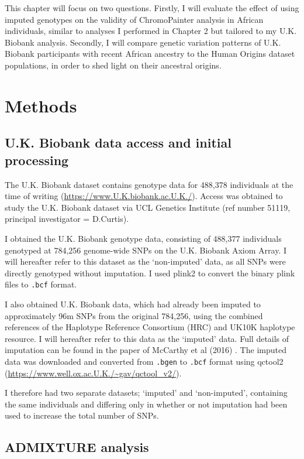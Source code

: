 This chapter will focus on two questions. Firstly, I will evaluate the effect of using imputed genotypes on the validity of ChromoPainter analysis in African individuals, similar to analyses I performed in Chapter 2 but tailored to my U.K. Biobank analysis. Secondly, I will compare genetic variation patterns of U.K. Biobank participants with recent African ancestry to the Human Origins dataset populations, in order to shed light on their ancestral origins.

\section{Methods}

\subsection{U.K. Biobank data access and initial processing}

The U.K. Biobank dataset contains genotype data for 488,378 individuals at the time of writing (\url{https://www.U.K.biobank.ac.U.K./}). Access was obtained to study the U.K. Biobank dataset via UCL Genetics Institute (ref number 51119, principal investigator = D.Curtis). 

I obtained the U.K. Biobank genotype data, consisting of 488,377 individuals genotyped at 784,256 genome-wide SNPs on the U.K. Biobank Axiom Array. I will hereafter refer to this dataset as the `non-imputed' data, as all SNPs were directly genotyped without imputation. I used plink2 \cite{purcell2007plink} to convert the binary plink files to \texttt{.bcf} format. 

I also obtained U.K. Biobank data, which had already been imputed to approximately 96m SNPs from the original 784,256, using the combined references of the Haplotype Reference Consortium (HRC) and UK10K haplotype resource. I will hereafter refer to this data as the `imputed' data. Full details of imputation can be found in the paper of McCarthy et al (2016) \cite{mccarthy2016reference}. The imputed data was downloaded and converted from \texttt{.bgen} to \texttt{.bcf} format using qctool2 (\url{https://www.well.ox.ac.U.K./~gav/qctool_v2/}). 

I therefore had two separate datasets; `imputed' and `non-imputed', containing the same individuals and differing only in whether or not imputation had been used to increase the total number of SNPs.

\subsection{ADMIXTURE analysis}

